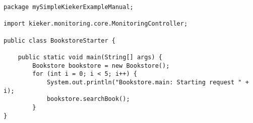 \begin{lstlisting}[caption=BookstoreStarter.java] 
package mySimpleKiekerExampleManual;

import kieker.monitoring.core.MonitoringController;

public class BookstoreStarter {

    public static void main(String[] args) {
        Bookstore bookstore = new Bookstore();
        for (int i = 0; i < 5; i++) {
            System.out.println("Bookstore.main: Starting request " + i);
            bookstore.searchBook();
        }
}
\end{lstlisting}